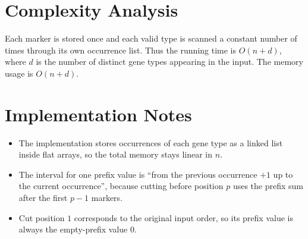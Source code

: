 \documentclass[11pt]{article}
\begin{document}
\section*{Complexity Analysis}

Each marker is stored once and each valid type is scanned a constant number of times through its own occurrence list. Thus the running time is $O(n + d)$, where $d$ is the number of distinct gene types appearing in the input. The memory usage is $O(n + d)$.

\section*{Implementation Notes}

\begin{itemize}[leftmargin=*]
    \item The implementation stores occurrences of each gene type as a linked list inside flat arrays, so the total memory stays linear in $n$.
    \item The interval for one prefix value is ``from the previous occurrence $+1$ up to the current occurrence'', because cutting before position $p$ uses the prefix sum after the first $p-1$ markers.
    \item Cut position $1$ corresponds to the original input order, so its prefix value is always the empty-prefix value $0$.
\end{itemize}
\end{document}
